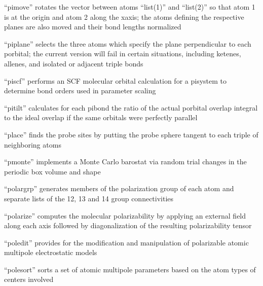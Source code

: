 \documentclass[letterpaper,11pt,english]{sphinxmanual}
\begin{document}

“pimove” rotates the vector between atoms “list(1)” and
“list(2)” so that atom 1 is at the origin and atom 2 along
the x\sphinxhyphen{}axis; the atoms defining the respective planes are
also moved and their bond lengths normalized


“piplane” selects the three atoms which specify the plane
perpendicular to each p\sphinxhyphen{}orbital; the current version will
fail in certain situations, including ketenes, allenes,
and isolated or adjacent triple bonds


“piscf” performs an SCF molecular orbital calculation for a
pisystem to determine bond orders used in parameter scaling


“pitilt” calculates for each pibond the ratio of the
actual p\sphinxhyphen{}orbital overlap integral to the ideal overlap
if the same orbitals were perfectly parallel


“place” finds the probe sites by putting the probe sphere
tangent to each triple of neighboring atoms


“pmonte” implements a Monte Carlo barostat via random trial
changes in the periodic box volume and shape


“polargrp” generates members of the polarization group of
each atom and separate lists of the 1\sphinxhyphen{}2, 1\sphinxhyphen{}3 and 1\sphinxhyphen{}4 group
connectivities


“polarize” computes the molecular polarizability by applying
an external field along each axis followed by diagonalization
of the resulting polarizability tensor


“poledit” provides for the modification and manipulation
of polarizable atomic multipole electrostatic models


“polesort” sorts a set of atomic multipole parameters based
on the atom types of centers involved
\end{document}
